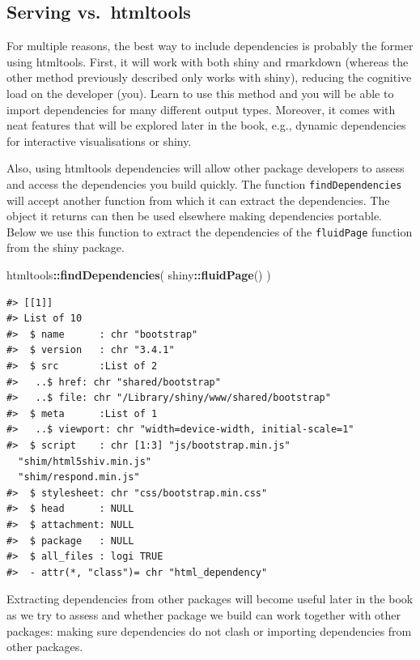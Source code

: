 \documentclass[
  10pt,
]{krantz}
\makeatletter
\newenvironment{Shaded}{\begin{snugshade}}{\end{snugshade}}
\newcommand{\KeywordTok}[1]{\textcolor[rgb]{0.27,0.27,0.27}{\textbf{#1}}}
\newcommand{\NormalTok}[1]{#1}
\newcommand{\OperatorTok}[1]{\textcolor[rgb]{0.43,0.43,0.43}{\textbf{#1}}}
\newenvironment{kframe}{%
\medskip{}
\setlength{\fboxsep}{.8em}
 \def\at@end@of@kframe{}%
 \ifinner\ifhmode%
  \def\at@end@of@kframe{\end{minipage}}%
  \begin{minipage}{\columnwidth}%
 \fi\fi%
 \def\FrameCommand##1{\hskip\@totalleftmargin \hskip-\fboxsep
 \colorbox{shadecolor}{##1}\hskip-\fboxsep
     \hskip-\linewidth \hskip-\@totalleftmargin \hskip\columnwidth}%
 \MakeFramed {\advance\hsize-\width
   \@totalleftmargin\z@ \linewidth\hsize
   \@setminipage}}%
 {\par\unskip\endMakeFramed%
 \at@end@of@kframe}
\renewenvironment{Shaded}{\begin{kframe}}{\end{kframe}}
\makeatother
\begin{document}
\hypertarget{basics-deps-pro-cons}{%
\subsection{Serving vs.~htmltools}\label{basics-deps-pro-cons}}

For multiple reasons, the best way to include dependencies is probably the former using htmltools. First, it will work with both shiny and rmarkdown \citep{R-rmarkdown} (whereas the other method previously described only works with shiny), reducing the cognitive load on the developer (you). Learn to use this method and you will be able to import dependencies for many different output types. Moreover, it comes with neat features that will be explored later in the book, e.g., dynamic dependencies for interactive visualisations or shiny.

Also, using htmltools dependencies will allow other package developers to assess and access the dependencies you build quickly. The function \texttt{findDependencies} will accept another function from which it can extract the dependencies. The object it returns can then be used elsewhere making dependencies portable. Below we use this function to extract the dependencies of the \texttt{fluidPage} function from the shiny package.

\begin{Shaded}
\begin{Highlighting}[]
\NormalTok{htmltools}\OperatorTok{::}\KeywordTok{findDependencies}\NormalTok{(}
\NormalTok{  shiny}\OperatorTok{::}\KeywordTok{fluidPage}\NormalTok{()}
\NormalTok{) }
\end{Highlighting}
\end{Shaded}

\begin{verbatim}
#> [[1]]
#> List of 10
#>  $ name      : chr "bootstrap"
#>  $ version   : chr "3.4.1"
#>  $ src       :List of 2
#>   ..$ href: chr "shared/bootstrap"
#>   ..$ file: chr "/Library/shiny/www/shared/bootstrap"
#>  $ meta      :List of 1
#>   ..$ viewport: chr "width=device-width, initial-scale=1"
#>  $ script    : chr [1:3] "js/bootstrap.min.js" 
  "shim/html5shiv.min.js" 
  "shim/respond.min.js"
#>  $ stylesheet: chr "css/bootstrap.min.css"
#>  $ head      : NULL
#>  $ attachment: NULL
#>  $ package   : NULL
#>  $ all_files : logi TRUE
#>  - attr(*, "class")= chr "html_dependency"
\end{verbatim}

Extracting dependencies from other packages will become useful later in the book as we try to assess and whether package we build can work together with other packages: making sure dependencies do not clash or importing dependencies from other packages.
\end{document}
